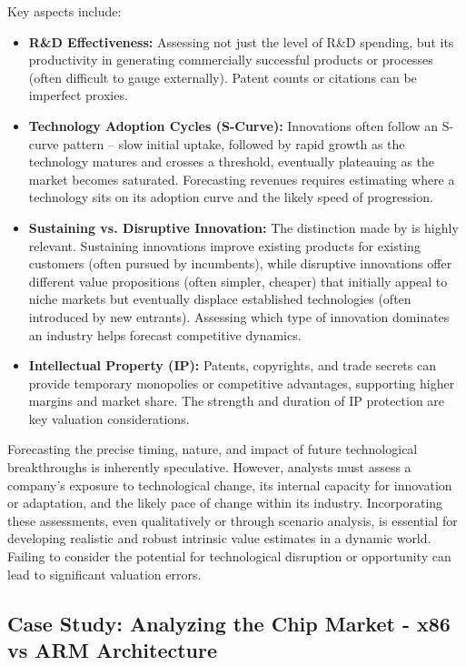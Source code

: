 Key aspects include:
\begin{itemize}
    \item \textbf{R\&D Effectiveness:} Assessing not just the level of R\&D spending, but its productivity in generating commercially successful products or processes (often difficult to gauge externally). Patent counts or citations can be imperfect proxies.
    \item \textbf{Technology Adoption Cycles (S-Curve):} Innovations often follow an S-curve pattern – slow initial uptake, followed by rapid growth as the technology matures and crosses a threshold, eventually plateauing as the market becomes saturated. Forecasting revenues requires estimating where a technology sits on its adoption curve and the likely speed of progression.
    \item \textbf{Sustaining vs. Disruptive Innovation:} The distinction made by \textcite{christensen1997innovator} is highly relevant. Sustaining innovations improve existing products for existing customers (often pursued by incumbents), while disruptive innovations offer different value propositions (often simpler, cheaper) that initially appeal to niche markets but eventually displace established technologies (often introduced by new entrants). Assessing which type of innovation dominates an industry helps forecast competitive dynamics.
    \item \textbf{Intellectual Property (IP):} Patents, copyrights, and trade secrets can provide temporary monopolies or competitive advantages, supporting higher margins and market share. The strength and duration of IP protection are key valuation considerations.
\end{itemize}

Forecasting the precise timing, nature, and impact of future technological breakthroughs is inherently speculative. However, analysts must assess a company's exposure to technological change, its internal capacity for innovation or adaptation, and the likely pace of change within its industry. Incorporating these assessments, even qualitatively or through scenario analysis, is essential for developing realistic and robust intrinsic value estimates in a dynamic world. Failing to consider the potential for technological disruption or opportunity can lead to significant valuation errors.

\subsection{Case Study: Analyzing the Chip Market - x86 vs ARM Architecture}
\label{case:x86_vs_arm}

